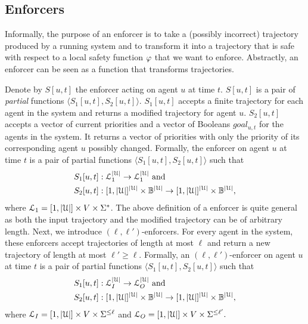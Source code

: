\subsection{Enforcers}
Informally, the purpose of an enforcer is to take a (possibly incorrect) trajectory produced by a running system and to transform it into a trajectory that is safe with respect to a local safety function $\varphi$ that we want to enforce. Abstractly, an enforcer can be seen as a function that transforms trajectories. 

Denote by $S[u,t]$ the enforcer acting on agent $u$ at time $t$. $S[u,t]$ is a pair of \emph{partial} functions $\langle S_1[u,t],S_2[u,t] \rangle$. $S_1[u,t]$ accepts a finite trajectory for each agent in the system and returns a modified trajectory for agent $u$. $S_2[u,t]$ accepts a vector of current priorities and a vector of Booleans $goal_{u,t}$ for the agents in the system. It returns a vector of priorities with only the priority of its corresponding agent $u$ possibly changed. Formally, the enforcer on agent $u$ at time $t$ is a pair of partial functions $\langle S_1[u,t],S_2[u,t] \rangle$ such that
\begin{align}
    &S_1[u,t] : \mathcal{L}_1 ^{|\mathcal{U}|} \to \mathcal{L}_1^{|\mathcal{U}|} \text { and } \\
    &S_2[u,t] : [1,|\mathcal{U}|]^{|\mathcal{U}|} \times \mathbb{B}^{|\mathcal{U}|} \to [1,|\mathcal{U}|]^{|\mathcal{U}|} \times \mathbb{B}^{|\mathcal{U}|}, 
\end{align}
\noindent where $\mathcal{L}_1 = [1,|\mathcal{U}|] \times V \times \Sigma^*$. The above definition of a enforcer is quite general as both the input trajectory and the modified trajectory can be of arbitrary length. Next, we introduce $(\ell,\ell')$-enforcers. For every agent in the system, these enforcers accept trajectories of length at most $\ell$ and return a new trajectory of length at most $\ell' \geq \ell$.  
Formally, an $(\ell,\ell')$-enforcer 
on agent $u$ at time $t$ is a pair of partial functions $\langle S_1[u,t],S_2[u,t] \rangle$ such that 
\begin{align}
    &S_1[u,t] : \mathcal{L}_I ^{|\mathcal{U}|} \to \mathcal{L}_O ^{|\mathcal{U}|} \text{ and } \\ 
    &S_2[u,t] : [1,|\mathcal{U}|]^{|\mathcal{U}|} \times \mathbb{B}^{|\mathcal{U}|} \to [1,|\mathcal{U}|]^{|\mathcal{U}|} \times \mathbb{B}^{|\mathcal{U}|}, 
\end{align}
\noindent where $\mathcal{L}_I = [1,|\mathcal{U}|] \times V \times \Sigma^{\leq \ell}$ and $\mathcal{L}_O = [1,|\mathcal{U}|] \times V \times \Sigma^{\leq \ell'}.$

